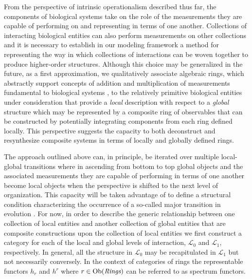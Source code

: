\documentclass[aps,twocolumn]{revtex4-1}
\begin{document}
From the perspective of intrinsic operationalism described thus far, the components of biological systems take on the role of the measurements they are capable of performing on and representing in terms of one another. Collections of interacting biological entities can also perform measurements on other collections and it is necessary to establish in our modeling framework a method for representing the way in which collections of interactions can be woven together to produce higher-order structures. Although this choice may be generalized in the future, as a first approximation, we qualitatively associate algebraic rings, which abstractly support concepts of addition and multiplication of measurements fundamental to biological systems \cite{Houle2011}, to the relatively primitive biological entities under consideration that provide a {\it local} description with respect to a {\it global} structure which may be represented by a composite ring of observables that can be constructed by potentially integrating components from each ring defined locally. This perspective suggests the capacity to both deconstruct and resynthesize composite systems in terms of locally and globally defined rings.

The approach outlined above can, in principle, be iterated over multiple local-global transitions where in ascending from bottom to top global objects and the associated measurements they are capable of performing in terms of one another become local objects when the perspective is shifted to the next level of organization. This capacity will be taken advantage of to define a structural condition characterizing the occurrence of a so-called major transition in evolution \cite{MaynardSmith1995,Okasha2006,Calcott2011}. For now, in order to describe the generic relationship between one collection of local entities and another collection of global entities that are composite constructions upon the collection of local entities we first construct a category for each of the local and global levels of interaction, $\mathcal{L}_0$ and $\mathcal{L}_1$, respectively. In general, all the structure in $\mathcal{L}_0$ may be recapitulated in $\mathcal{L}_1$ but not necessarily conversely. In the context of categories of rings the representable functors $h_r$ and $h^r$ where $r \in \mathop{\rm Ob}\nolimits(\textit{Rings})$ can be referred to as spectrum functors.

\end{document}

